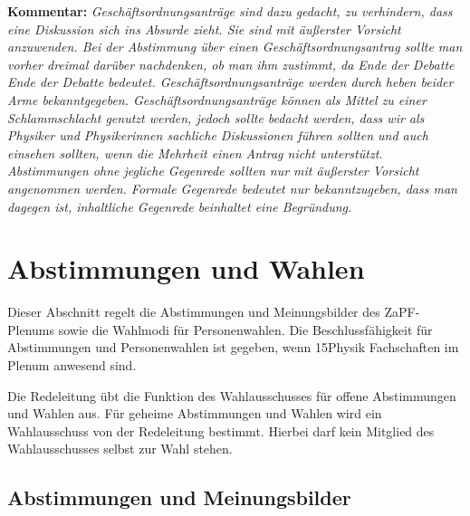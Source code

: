 \documentclass[draft,12pt,oneside]{scrreprt}
\begin{document}
\textbf{Kommentar:} \textit{\footnotesize Geschäftsordnungsanträge sind dazu
  gedacht, zu verhindern, dass eine Diskussion sich ins Absurde zieht.
  Sie sind mit äußerster Vorsicht anzuwenden.
  Bei der Abstimmung über einen Geschäftsordnungsantrag sollte man vorher dreimal
  darüber nachdenken, ob man ihm zustimmt, da Ende der Debatte Ende der Debatte
  bedeutet.
  Geschäftsordnungsanträge werden durch heben beider Arme bekanntgegeben.
  Geschäftsordnungsanträge können als Mittel zu einer Schlammschlacht genutzt
  werden, jedoch sollte bedacht werden, dass wir als Physiker und Physikerinnen sachliche
  Diskussionen führen sollten und auch einsehen sollten, wenn die Mehrheit einen
  Antrag nicht unterstützt.
  Abstimmungen ohne jegliche Gegenrede sollten nur mit äußerster Vorsicht
  angenommen werden.
  Formale Gegenrede bedeutet nur bekanntzugeben, dass man dagegen ist, inhaltliche
  Gegenrede beinhaltet eine Begründung.}

\section{Abstimmungen und Wahlen}

Dieser Abschnitt regelt die Abstimmungen und Meinungsbilder des ZaPF-Plenums
sowie die Wahlmodi für Personenwahlen. Die Beschlussfähigkeit für Abstimmungen
und Personenwahlen ist gegeben, wenn 15\footnotemark Physik Fachschaften
im Plenum anwesend sind.

Die Redeleitung übt die Funktion des Wahlausschusses für offene Abstimmungen und
Wahlen aus. Für geheime Abstimmungen und Wahlen wird ein Wahlausschuss von der
Redeleitung bestimmt. Hierbei darf kein Mitglied des Wahlausschusses selbst zur
Wahl stehen.



\subsection{Abstimmungen und Meinungsbilder}
\end{document}
